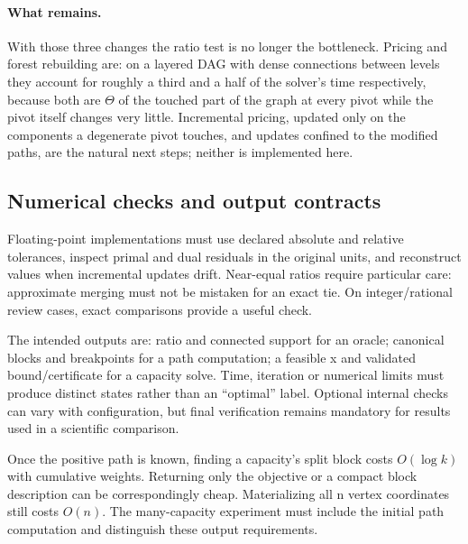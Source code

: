 \paragraph{What remains.} With those three changes the ratio test is no longer
the bottleneck. Pricing and forest rebuilding are: on a layered DAG with dense
connections between levels they account for roughly a third and a half of the
solver's time respectively, because both are $\Theta$ of the touched part of the
graph at every pivot while the pivot itself changes very little. Incremental
pricing, updated only on the components a degenerate pivot touches, and updates
confined to the modified paths, are the natural next steps; neither is
implemented here.

\subsection{Numerical checks and output contracts}
Floating-point implementations must use declared absolute and relative
tolerances, inspect primal and dual residuals in the original units, and
reconstruct values when incremental updates drift. Near-equal ratios require
particular care: approximate merging must not be mistaken for an exact tie.
On integer/rational review cases, exact comparisons provide a useful check.

The intended outputs are: ratio and connected support for an oracle;
canonical blocks and breakpoints for a path computation; a feasible x and
validated bound/certificate for a capacity solve. Time, iteration or numerical
limits must produce distinct states rather than an ``optimal'' label.
Optional internal checks can vary with configuration, but final verification
remains mandatory for results used in a scientific comparison.

Once the positive path is known, finding a capacity's split block costs
$O(\log k)$ with cumulative weights. Returning only the objective or a compact
block description can be correspondingly cheap. Materializing all n vertex
coordinates still costs $O(n)$. The many-capacity experiment must include the
initial path computation and distinguish these output requirements.
